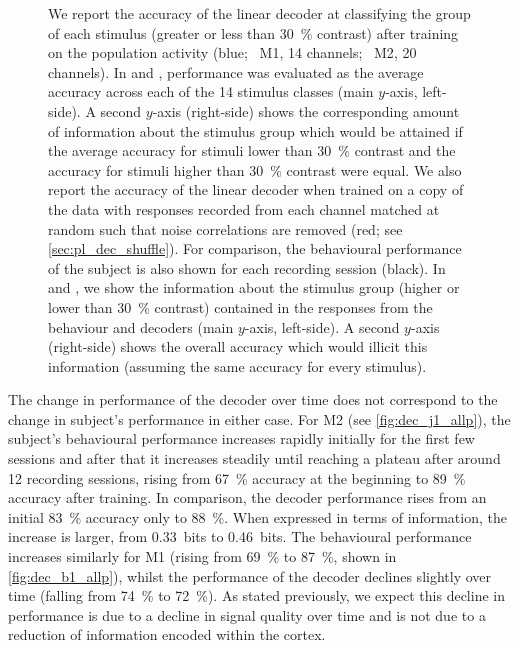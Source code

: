 \begin{figure}[htbp]
{    }
    \hspace*{\fill}
    \caption{
    We report the accuracy of the linear decoder at classifying the group of each stimulus (greater or less than \SI{30}{\percent} contrast) after training on the population activity (blue; \protect{}~\ac{M1}, \num{14} channels; \protect{}~\ac{M2}, \num{20} channels).
    In \protect{} and \protect{}, performance was evaluated as the average accuracy across each of the \num{14} stimulus classes (main $y$-axis, left-side).
    A second $y$-axis (right-side) shows the corresponding amount of information about the stimulus group which would be attained if the average accuracy for stimuli lower than \SI{30}{\percent} contrast and the accuracy for stimuli higher than \SI{30}{\percent} contrast were equal.
    We also report the accuracy of the linear decoder when trained on a copy of the data with responses recorded from each channel matched at random such that noise correlations are removed (red; see \autoref{sec:pl_dec_shuffle}).
    For comparison, the behavioural performance of the subject is also shown for each recording session (black).
    In \protect{} and \protect{}, we show the information about the stimulus group (higher or lower than \SI{30}{\percent} contrast) contained in the responses from the behaviour and decoders (main $y$-axis, left-side).
    A second $y$-axis (right-side) shows the overall accuracy which would illicit this information (assuming the same accuracy for every stimulus).
}
    \label{fig:dec_all_v1}
\end{figure}

The change in performance of the decoder over time does not correspond to the change in subject's performance in either case.
For \ac{M2} (see \autoref{fig:dec_j1_allp}), the subject's behavioural performance increases rapidly initially for the first few sessions and after that it increases steadily until reaching a plateau after around \num{12} recording sessions, rising from \SI{67}{\percent} accuracy at the beginning to \SI{89}{\percent} accuracy after training.
In comparison, the decoder performance rises from an initial \SI{83}{\percent} accuracy only to \SI{88}{\percent}.
When expressed in terms of information, the increase is larger, from \SI{0.33}{bits} to \SI{0.46}{bits}.
The behavioural performance increases similarly for \ac{M1} (rising from \SI{69}{\percent} to \SI{87}{\percent}, shown in \autoref{fig:dec_b1_allp}), whilst the performance of the decoder declines slightly over time (falling from \SI{74}{\percent} to \SI{72}{\percent}).
As stated previously, we expect this decline in performance is due to a decline in signal quality over time and is not due to a reduction of information encoded within the cortex.

